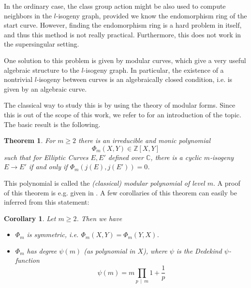 \documentclass{ociamthesis}
\newcommand{\Z}{\mathbb{Z}}
\newcommand{\C}{\mathbb{C}}
\newcommand{\divides}{\ \mid \ }
\newtheorem{theorem}[prop]{Theorem}
\newtheorem{corollary}[prop]{Corollary}
\theoremstyle{definition}
\begin{document}
In the ordinary case, the class group action might be also used to compute neighbors in the $l$-isogeny graph, provided we know the endomorphism ring of the start curve.
However, finding the endomorphism ring is a hard problem in itself, and thus this method is not really practical.
Furthermore, this does not work in the supersingular setting.

One solution to this problem is given by modular curves, which give a very useful algebraic structure to the $l$-isogeny graph.
In particular, the existence of a nontrivial $l$-isogeny between curves is an algebraically closed condition, i.e. is given by an algebraic curve.

The classical way to study this is by using the theory of modular forms.
Since this is out of the scope of this work, we refer to \cite[§11]{cox_primes_of_form} for an introduction of the topic.
The basic result is the following.
\begin{theorem}
    \label{prop:complex_mod_poly}
    For $m \geq 2$ there is an irreducible and monic polynomial
    \begin{equation*}
        \Phi_m(X, Y) \in \Z[X, Y]
    \end{equation*}
    such that for Elliptic Curves $E, E'$ defined over $\C$, there is a cyclic $m$-isogeny $E \to E'$ if and only if $\Phi_m(j(E), j(E')) = 0$.
\end{theorem}
This polynomial is called the \emph{(classical) modular polynomial of level $m$}.
A proof of this theorem is e.g. given in \cite[Thm~11.18]{cox_primes_of_form}.
A few corollaries of this theorem can easily be inferred from this statement:
\begin{corollary}
    Let $m \geq 2$. Then we have
    \begin{itemize}
        \item $\Phi_m$ is symmetric, i.e. $\Phi_m(X, Y) = \Phi_m(Y, X)$.
        \item $\Phi_m$ has degree $\psi(m)$ (as polynomial in $X$), where $\psi$ is the Dedekind $\psi$-function
        \begin{equation*}
            \psi(m) = m \prod_{p \divides m} 1 + \frac 1 p
        \end{equation*}
    \end{itemize}
\end{corollary}
\end{document}
